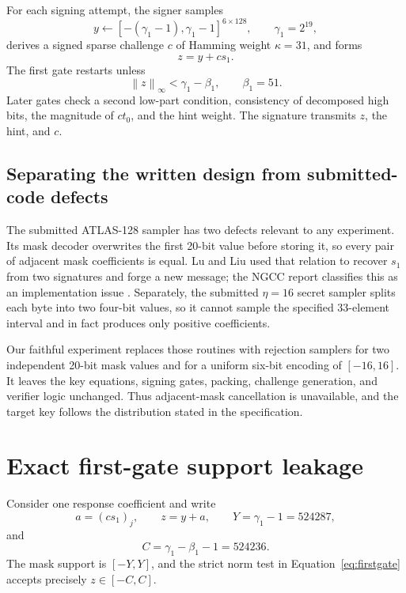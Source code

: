 \documentclass[11pt,a4paper]{article}
\newcommand{\norm}[1]{\left\lVert #1\right\rVert}
\begin{document}
For each signing attempt, the signer samples
\[
       y\leftarrow[-(\gamma_1-1),\gamma_1-1]^{6\times128},
       \qquad \gamma_1=2^{19},
\]
derives a signed sparse challenge $c$ of Hamming weight $\kappa=31$, and
forms
\begin{equation}
                         z=y+cs_1.
\label{eq:response}
\end{equation}
The first gate restarts unless
\begin{equation}
                 \norm{z}_\infty<\gamma_1-\beta_1,
                 \qquad \beta_1=51.
\label{eq:firstgate}
\end{equation}
Later gates check a second low-part condition, consistency of decomposed high
bits, the magnitude of $ct_0$, and the hint weight.  The signature transmits
$z$, the hint, and $c$.

\subsection{Separating the written design from submitted-code defects}

The submitted ATLAS-128 sampler has two defects relevant to any experiment.
Its mask decoder overwrites the first 20-bit value before storing it, so every
pair of adjacent mask coefficients is equal.  Lu and Liu used that relation
to recover $s_1$ from two signatures and forge a new message; the NGCC report
classifies this as an implementation issue \cite{NGCC15}.  Separately, the
submitted $\eta=16$ secret sampler splits each byte into two four-bit values,
so it cannot sample the specified 33-element interval and in fact produces
only positive coefficients.

Our faithful experiment replaces those routines with rejection samplers for
two independent 20-bit mask values and for a uniform six-bit encoding of
$[-16,16]$.  It leaves the key equations, signing gates, packing, challenge
generation, and verifier logic unchanged.  Thus adjacent-mask cancellation
is unavailable, and the target key follows the distribution stated in the
specification.

\section{Exact first-gate support leakage}
\label{sec:support}

Consider one response coefficient and write
\[
  a=(cs_1)_j,\qquad z=y+a,\qquad
  Y=\gamma_1-1=524287,
\]
and
\[
  C=\gamma_1-\beta_1-1=524236.
\]
The mask support is $[-Y,Y]$, and the strict norm test in
Equation~\eqref{eq:firstgate} accepts precisely $z\in[-C,C]$.
\end{document}
